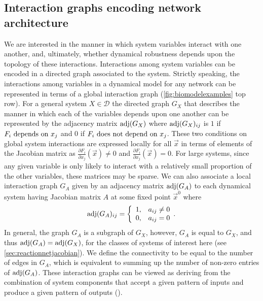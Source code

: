 \subsection{Interaction graphs encoding network architecture}
We are interested in the manner in which system variables interact with one another, and, ultimately, whether dynamical robustness depends upon the topology of these interactions. Interactions among system variables can be encoded in a directed graph associated to the system. Strictly speaking, the interactions among variables in a dynamical model for any network can be represented in terms of a global interaction graph (\ref{fig:biomodelexamples} top row).
For a general system $X \in \mathcal{D}$ the directed graph $G_X$ that describes the manner in which each of the variables depends upon one another can be represented by the adjacency matrix $\mathrm{adj}(G_X)$ where $\mathrm{adj}(G_X)_{ij}$ is $1$ if $F_i \hbox{ depends on } x_j$ and $0$ if $F_i \hbox{ does not depend on } x_j$. These two conditions on global system interactions are expressed locally for all $\vec{x}$ in terms of elements of the Jacobian matrix as $\frac{\partial F_i}{\partial x_j}(\vec{x}) \neq 0$ and $\frac{\partial F_i}{\partial x_j}(\vec{x}) = 0$.
For large systems, since any given variable is only likely to interact with a relatively small proportion of the other variables, these matrices may be sparse.
We can also associate a local interaction graph $G_A$ given by an adjacency matrix $\mathrm{adj}(G_A)$ to each dynamical system having Jacobian matrix $A$ at some fixed point $\vec{x}^0$ where
 \begin{equation}\label{eq:lininterdepadj}
   \mathrm{adj}(G_A)_{ij} = \left\{
     \begin{array}{lr}
       1, & a_{ij} \neq 0\\
       0, & a_{ij} = 0
     \end{array}.
   \right.
\end{equation}
In general, the graph $G_A$ is a subgraph of $G_X$, however, $G_A$ is equal to $G_X$, and thus $\mathrm{adj}(G_A) = \mathrm{adj}(G_X)$, for the classes of systems of interest here (see  \ref{sec:reactionnetjacobian}). We define the connectivity to be equal to the number of edges in $G_A$, which is equivalent to summing up the number of non-zero entries of $\mathrm{adj}(G_A)$.
These interaction graphs can be viewed as deriving from the combination of system components that accept a given pattern of inputs and produce a given pattern of outputs ().

